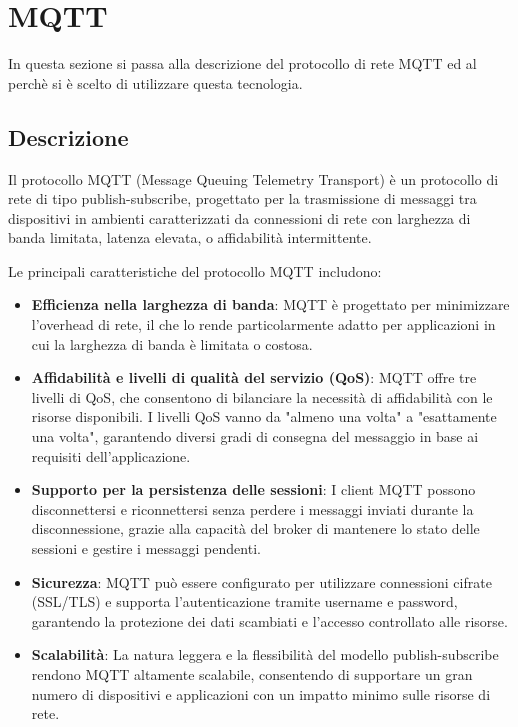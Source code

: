 \section{MQTT}
In questa sezione si passa alla descrizione del protocollo di rete MQTT ed al perchè si è scelto di utilizzare questa tecnologia.

\subsection{Descrizione}
Il protocollo MQTT (Message Queuing Telemetry Transport) è un protocollo di rete di tipo publish-subscribe, progettato per la trasmissione di messaggi tra dispositivi in ambienti caratterizzati da connessioni di rete con larghezza di banda limitata, latenza elevata, o affidabilità intermittente.

\noindent Le principali caratteristiche del protocollo MQTT includono:

\begin{itemize}
  \item \textbf{Efficienza nella larghezza di banda}: MQTT è progettato per minimizzare l'overhead di rete, il che lo rende particolarmente adatto per applicazioni in cui la larghezza di banda è limitata o costosa.
    
  \item \textbf{Affidabilità e livelli di qualità del servizio (QoS)}: MQTT offre tre livelli di QoS, che consentono di bilanciare la necessità di affidabilità con le risorse disponibili. I livelli QoS vanno da "almeno una volta" a "esattamente una volta", garantendo diversi gradi di consegna del messaggio in base ai requisiti dell'applicazione.
    
  \item \textbf{Supporto per la persistenza delle sessioni}: I client MQTT possono disconnettersi e riconnettersi senza perdere i messaggi inviati durante la disconnessione, grazie alla capacità del broker di mantenere lo stato delle sessioni e gestire i messaggi pendenti.

  \item \textbf{Sicurezza}: MQTT può essere configurato per utilizzare connessioni cifrate (SSL/TLS) e supporta l'autenticazione tramite username e password, garantendo la protezione dei dati scambiati e l'accesso controllato alle risorse.

  \item \textbf{Scalabilità}: La natura leggera e la flessibilità del modello publish-subscribe rendono MQTT altamente scalabile, consentendo di supportare un gran numero di dispositivi e applicazioni con un impatto minimo sulle risorse di rete.
\end{itemize}

